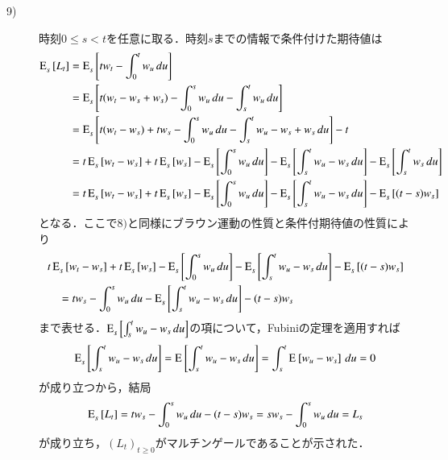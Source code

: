 \begin{prf}
\begin{description}
	\item[9)] 時刻$0 \leq s < t$を任意に取る．時刻$s$までの情報で条件付けた期待値は
		\begin{align}
			\Exp{L_t}{s}{} &= \Exp{tw_t - \int_{0}^{t} w_u\, du}{s}{} \\
			&= \Exp{t(w_t - w_s + w_s) - \int_{0}^{s} w_u\, du - \int_{s}^{t} w_u\, du}{s}{} \\
			&= \Exp{t(w_t - w_s) + tw_s - \int_{0}^{s} w_u\, du - \int_{s}^{t} w_u - w_s + w_s\, du}{s}{} - t \\
			&= t\Exp{w_t - w_s}{s}{} + t\Exp{w_s}{s}{} - \Exp{\int_{0}^{s} w_u\, du}{s}{} - \Exp{\int_{s}^{t} w_u - w_s\, du}{s}{}
				- \Exp{\int_{s}^{t} w_s\, du}{s}{} \\
			&= t\Exp{w_t - w_s}{s}{} + t\Exp{w_s}{s}{} - \Exp{\int_{0}^{s} w_u\, du}{s}{} - \Exp{\int_{s}^{t} w_u - w_s\, du}{s}{}
				- \Exp{(t-s) w_s}{s}{}
		\end{align}
		となる．ここで$8)$と同様にブラウン運動の性質と条件付期待値の性質により
		\begin{align}
			&t\Exp{w_t - w_s}{s}{} + t\Exp{w_s}{s}{} - \Exp{\int_{0}^{s} w_u\, du}{s}{} - \Exp{\int_{s}^{t} w_u - w_s\, du}{s}{}
				- \Exp{(t-s) w_s}{s}{} \\
			&\quad= tw_s - \int_{0}^{s} w_u\, du - \Exp{\int_{s}^{t} w_u - w_s\, du}{s}{} - (t-s) w_s
		\end{align}
		まで表せる．$\Exp{\int_{s}^{t} w_u - w_s\, du}{s}{}$の項について，Fubiniの定理を適用すれば
		\begin{align}
			\Exp{\int_{s}^{t} w_u - w_s\, du}{s}{} = \Exp{\int_{s}^{t} w_u - w_s\, du}{}{}
			= \int_{s}^{t} \Exp{w_u - w_s}{}{}\, du = 0
		\end{align}
		が成り立つから，結局
		\begin{align}
			\Exp{L_t}{s}{} = tw_s - \int_{0}^{s} w_u\, du - (t-s) w_s = sw_s - \int_{0}^{s} w_u\, du = L_s
		\end{align}
		が成り立ち，$(L_t)_{t \geq 0}$がマルチンゲールであることが示された．
	

\end{description}
\end{prf}
